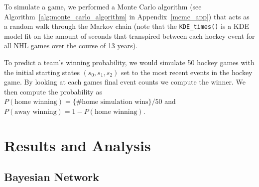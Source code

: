 \documentclass[11pt]{article}
\begin{document}
To simulate a game, we performed a Monte Carlo algorithm (see Algorithm~\ref{alg:monte_carlo_algorithm} in Appendix~\ref{mcmc_app})
that acts as a random walk through the Markov chain (note that the {\tt KDE\_times()} is a KDE model fit on the amount of seconds that transpired between 
each hockey event for all NHL games over the course of 13 years).

            


To predict a team's winning probability, we would simulate 50 hockey games with the initial starting states 
$(s_0, s_1, s_2)$ set to the most recent events in the hockey game. By looking at each games
final event counts we compute the winner. We then compute the 
probability as $P(\text{home winning}) = \{\text{\# home simulation wins}\}/50$ and 
$P(\text{away winning}) = 1-P(\text{home winning})$.

\section{Results and Analysis}

\subsection{Bayesian Network}
\end{document}
